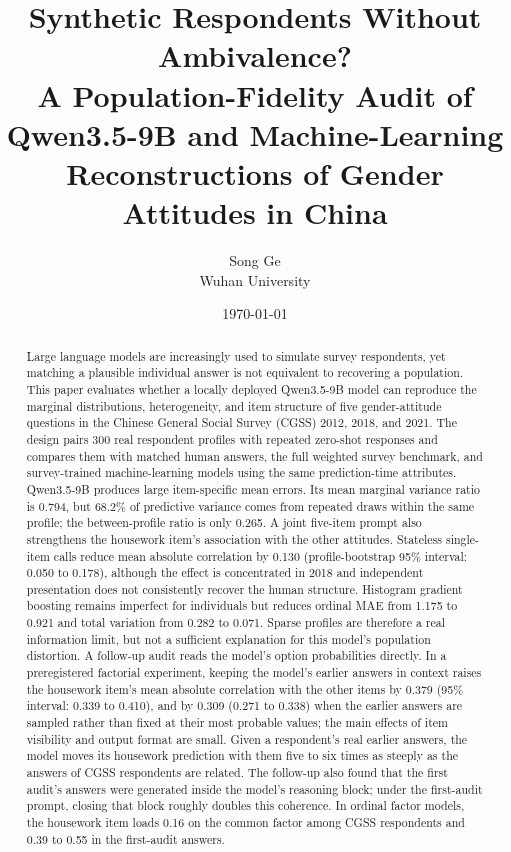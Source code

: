\documentclass[11pt]{article}
\title{\textbf{Synthetic Respondents Without Ambivalence?}\\
\large A Population-Fidelity Audit of Qwen3.5-9B and Machine-Learning Reconstructions of Gender Attitudes in China}
\author{Song Ge\\
\small Wuhan University}
\date{\today}
\begin{document}
\maketitle

\begin{abstract}
Large language models are increasingly used to simulate survey respondents, yet matching a plausible individual answer is not equivalent to recovering a population. This paper evaluates whether a locally deployed Qwen3.5-9B model can reproduce the marginal distributions, heterogeneity, and item structure of five gender-attitude questions in the Chinese General Social Survey (CGSS) 2012, 2018, and 2021. The design pairs 300 real respondent profiles with repeated zero-shot responses and compares them with matched human answers, the full weighted survey benchmark, and survey-trained machine-learning models using the same prediction-time attributes. Qwen3.5-9B produces large item-specific mean errors. Its mean marginal variance ratio is 0.794, but 68.2\% of predictive variance comes from repeated draws within the same profile; the between-profile ratio is only 0.265. A joint five-item prompt also strengthens the housework item's association with the other attitudes. Stateless single-item calls reduce mean absolute correlation by 0.130 (profile-bootstrap 95\% interval: 0.050 to 0.178), although the effect is concentrated in 2018 and independent presentation does not consistently recover the human structure. Histogram gradient boosting remains imperfect for individuals but reduces ordinal MAE from 1.175 to 0.921 and total variation from 0.282 to 0.071. Sparse profiles are therefore a real information limit, but not a sufficient explanation for this model's population distortion. A follow-up audit reads the model's option probabilities directly. In a preregistered factorial experiment, keeping the model's earlier answers in context raises the housework item's mean absolute correlation with the other items by 0.379 (95\% interval: 0.339 to 0.410), and by 0.309 (0.271 to 0.338) when the earlier answers are sampled rather than fixed at their most probable values; the main effects of item visibility and output format are small. Given a respondent's real earlier answers, the model moves its housework prediction with them five to six times as steeply as the answers of CGSS respondents are related. The follow-up also found that the first audit's answers were generated inside the model's reasoning block; under the first-audit prompt, closing that block roughly doubles this coherence. In ordinal factor models, the housework item loads 0.16 on the common factor among CGSS respondents and 0.39 to 0.55 in the first-audit answers.
\end{abstract}
\end{document}
